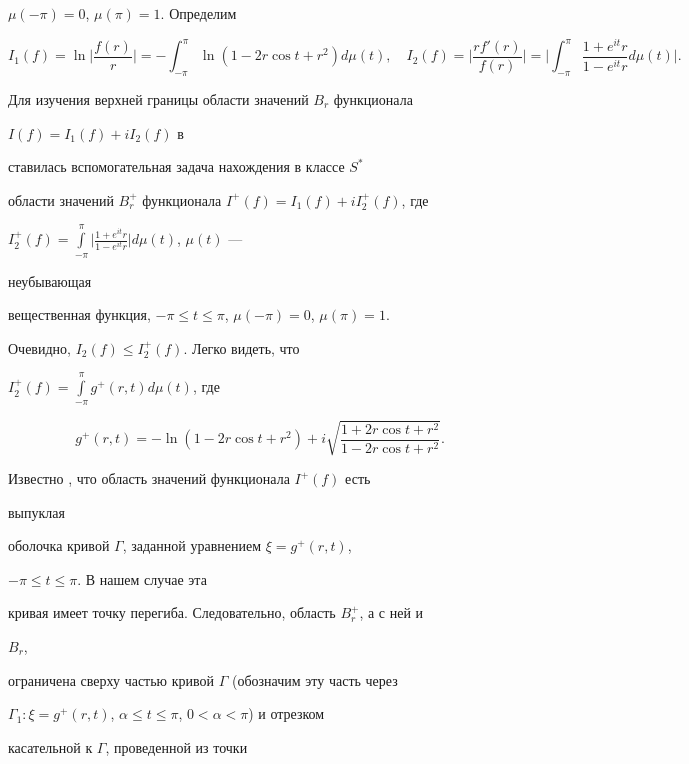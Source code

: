 $\mu(-\pi)=0$, $\mu(\pi)=1$. Определим 


$$ 


I_1(f)=\ln\bigg|\frac{f(r)}{r}\bigg|=-\int^\pi_{-\pi} 


\ln(1-2r\cos t+r^2)d\mu(t),\quad 


I_2(f)=\bigg|\frac{r f'(r)}{f(r)}\bigg|=\bigg| 


\int^\pi_{-\pi}\frac{1+e^{it}r}{1-e^{it}r}d\mu(t)\bigg|. 


$$ 


Для изучения верхней границы области значений $B_r$ функционала 


$I(f)=I_1(f)+i I_2(f)$ в 


\cite{1} ставилась вспомогательная задача нахождения в классе $S^*$ 


области значений $B^+_r$ функционала $I^+(f)=I_1(f)+i I^+_2(f)$, где 


$I^+_2(f)=\int\limits^\pi_{-\pi}\Big|\frac{1+e^{it}r}{1-e^{it}r}\Big| 


d\mu(t)$, $\mu(t)$ --- 


неубывающая 


вещественная функция, $-\pi\le t\le\pi$, $\mu(-\pi)=0$, $\mu(\pi)=1$. 


Очевидно, $I_2(f)\le I^+_2(f)$. Легко видеть, что 


$I^+_2(f)=\int\limits^\pi_{-\pi}g^+(r,t)d\mu(t)$, где 


\begin{equation} 


g^+(r,t)=-\ln(1-2r\cos t+r^2)+i 


\sqrt{\frac{1+2r\cos t+r^2}{1-2r\cos t+r^2}}. 


\end{equation} 


Известно \cite{4}, что область значений функционала $I^+(f)$ есть 


выпуклая 


оболочка кривой $\Gamma$, заданной уравнением $\xi=g^+(r,t)$, 


$-\pi\le t\le\pi$. В нашем случае эта 


кривая имеет точку перегиба. Следовательно, область $B^+_r$, а с ней и 


$B_r$, 


ограничена сверху частью кривой $\Gamma$ (обозначим эту часть через 


$\Gamma_1:\xi=g^+(r,t)$, $\alpha\le t\le\pi$, $0<\alpha<\pi$) и отрезком 


касательной к $\Gamma$, проведенной из точки 


